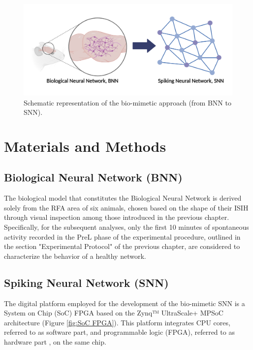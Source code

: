 \begin{figure}[ht!]
    \begin{center}
    \includegraphics[width=0.9\linewidth]{Figure/Biomimetic Approach.jpg}
    \end{center}
    \caption{Schematic representation of the bio-mimetic approach (from BNN to SNN).}
    \label{fig:Biomimetic Approach}
\end{figure}

\section{Materials and Methods}

\subsection{Biological Neural Network (BNN)}

The biological model that constitutes the Biological Neural Network is derived solely from the RFA area of six animals, chosen based on the shape of their ISIH through visual inspection among those introduced in the previous chapter. Specifically, for the subsequent analyses, only the first 10 minutes of spontaneous activity recorded in the PreL phase of the experimental procedure, outlined in the section "Experimental Protocol" of the previous chapter, are considered to characterize the behavior of a healthy network.

\subsection{Spiking Neural Network (SNN)}

The digital platform employed for the development of the bio-mimetic SNN is a System on Chip (SoC) FPGA based on the Zynq™ UltraScale+ MPSoC architecture (Figure \ref{fig:SoC FPGA}). This platform integrates CPU cores, referred to as software part, and programmable logic (FPGA), referred to as hardware part \cite{Beaubois2023}, on the same chip. 

